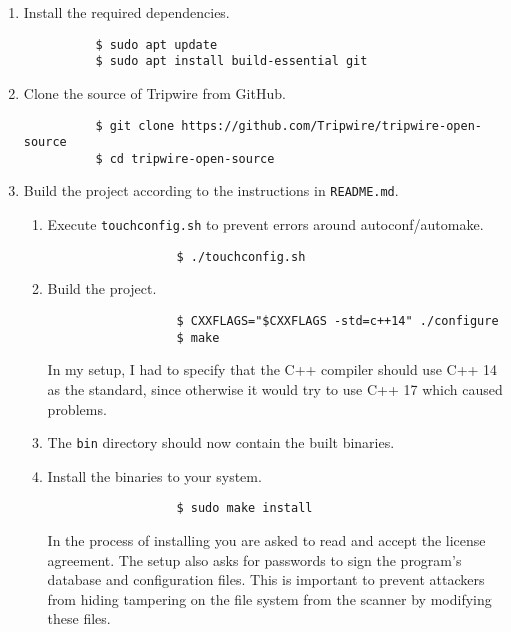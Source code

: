 \begin{enumerate}
  \item Install the required dependencies.

        \begin{verbatim}
          $ sudo apt update
          $ sudo apt install build-essential git
        \end{verbatim}

  \item Clone the source of Tripwire from GitHub.

        \begin{verbatim}
          $ git clone https://github.com/Tripwire/tripwire-open-source
          $ cd tripwire-open-source
        \end{verbatim}

  \item Build the project according to the instructions in \texttt{README.md}.

        \begin{enumerate}
          \item Execute \texttt{touchconfig.sh} to prevent errors around autoconf/automake.

                \begin{verbatim}
                  $ ./touchconfig.sh
                \end{verbatim}

          \item Build the project.

                \begin{verbatim}
                  $ CXXFLAGS="$CXXFLAGS -std=c++14" ./configure
                  $ make
                \end{verbatim}

                In my setup, I had to specify that the C++ compiler should use C++ 14 as the standard, since otherwise it would try to use C++ 17 which caused problems.

          \item The \texttt{bin} directory should now contain the built binaries.

          \item Install the binaries to your system.

                \begin{verbatim}
                  $ sudo make install
                \end{verbatim}

                In the process of installing you are asked to read and accept the license agreement.
                The setup also asks for passwords to sign the program's database and configuration files.
                This is important to prevent attackers from hiding tampering on the file system from the scanner by modifying these files.


\end{enumerate}
\end{enumerate}
